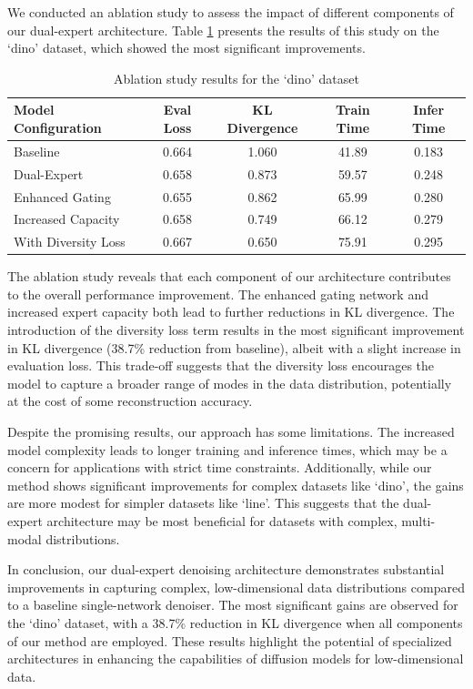 \documentclass{article} %
\begin{document}
We conducted an ablation study to assess the impact of different components of our dual-expert architecture. Table \ref{tab:ablation_study} presents the results of this study on the `dino' dataset, which showed the most significant improvements.

\begin{table}[h]
\centering
\caption{Ablation study results for the `dino' dataset}
\label{tab:ablation_study}
\begin{tabular}{lcccc}
\toprule
Model Configuration & Eval Loss & KL Divergence & Train Time & Infer Time \\
\midrule
Baseline & 0.664 & 1.060 & 41.89 & 0.183 \\
Dual-Expert & 0.658 & 0.873 & 59.57 & 0.248 \\
Enhanced Gating & 0.655 & 0.862 & 65.99 & 0.280 \\
Increased Capacity & 0.658 & 0.749 & 66.12 & 0.279 \\
With Diversity Loss & 0.667 & 0.650 & 75.91 & 0.295 \\
\bottomrule
\end{tabular}
\end{table}

The ablation study reveals that each component of our architecture contributes to the overall performance improvement. The enhanced gating network and increased expert capacity both lead to further reductions in KL divergence. The introduction of the diversity loss term results in the most significant improvement in KL divergence (38.7\% reduction from baseline), albeit with a slight increase in evaluation loss. This trade-off suggests that the diversity loss encourages the model to capture a broader range of modes in the data distribution, potentially at the cost of some reconstruction accuracy.

Despite the promising results, our approach has some limitations. The increased model complexity leads to longer training and inference times, which may be a concern for applications with strict time constraints. Additionally, while our method shows significant improvements for complex datasets like `dino', the gains are more modest for simpler datasets like `line'. This suggests that the dual-expert architecture may be most beneficial for datasets with complex, multi-modal distributions.

In conclusion, our dual-expert denoising architecture demonstrates substantial improvements in capturing complex, low-dimensional data distributions compared to a baseline single-network denoiser. The most significant gains are observed for the `dino' dataset, with a 38.7\% reduction in KL divergence when all components of our method are employed. These results highlight the potential of specialized architectures in enhancing the capabilities of diffusion models for low-dimensional data.
\end{document}
